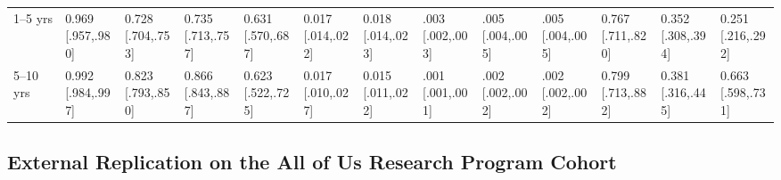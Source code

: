 \documentclass{article}
\begin{document}
\begin{table}
{\begin{tabular}{l lll lll lll lll}
1--5 yrs & \makecell[l]{0.969\\{[.957,.980]}} & \makecell[l]{0.728\\{[.704,.753]}} & \makecell[l]{0.735\\{[.713,.757]}} & \makecell[l]{0.631\\{[.570,.687]}} & \makecell[l]{0.017\\{[.014,.022]}} & \makecell[l]{0.018\\{[.014,.023]}} & \makecell[l]{.003\\{[.002,.003]}} & \makecell[l]{.005\\{[.004,.005]}} & \makecell[l]{.005\\{[.004,.005]}} & \makecell[l]{0.767\\{[.711,.820]}} & \makecell[l]{0.352\\{[.308,.394]}} & \makecell[l]{0.251\\{[.216,.292]}} \\
5--10 yrs & \makecell[l]{0.992\\{[.984,.997]}} & \makecell[l]{0.823\\{[.793,.850]}} & \makecell[l]{0.866\\{[.843,.887]}} & \makecell[l]{0.623\\{[.522,.725]}} & \makecell[l]{0.017\\{[.010,.027]}} & \makecell[l]{0.015\\{[.011,.022]}} & \makecell[l]{.001\\{[.001,.001]}} & \makecell[l]{.002\\{[.002,.002]}} & \makecell[l]{.002\\{[.002,.002]}} & \makecell[l]{0.799\\{[.713,.882]}} & \makecell[l]{0.381\\{[.316,.445]}} & \makecell[l]{0.663\\{[.598,.731]}} \\
\bottomrule
\end{tabular}%
}
\end{table}


\subsection*{External Replication on the All of Us Research Program Cohort}
\end{document}

